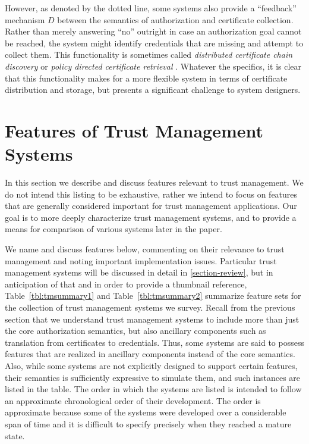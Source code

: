 However, as denoted by the dotted line, some systems also provide a
``feedback'' mechanism $D$ between the semantics of authorization and
certificate collection.  Rather than merely answering ``no'' outright
in case an authorization goal cannot be reached, the system might
identify credentials that are missing and attempt to collect them.
This functionality is sometimes called \emph{distributed certificate
chain discovery} \cite{Li:DCDTM} or \emph{policy directed certificate
retrieval} \cite{Gunter:PDCR}.
Whatever the specifics, it is clear that this functionality makes for
a more flexible system in terms of certificate distribution and
storage, but presents a significant challenge to system designers.

\section{Features of Trust Management Systems}
\label{section-features}

In this section we describe and discuss features relevant to trust
management.  We do not intend this listing to be exhaustive, rather we
intend to focus on features that are generally considered important
for trust management applications.  Our goal is to more deeply
characterize trust management systems, and to provide a means for
comparison of various systems later in the paper.

We name and discuss features below, commenting on their relevance to trust
management and noting important implementation issues. Particular trust
management systems will be discussed in detail in \autoref{section-review},
but in anticipation of that and in order to provide a thumbnail reference,
Table~\ref{tbl:tmsummary1} and Table~\ref{tbl:tmsummary2} summarize feature
sets for the collection of trust management systems we survey. Recall from
the previous section that we understand trust management systems to
include more than just the core authorization semantics, but also ancillary
components such as translation from certificates to credentials. Thus, some
systems are said to possess features that are realized in ancillary
components instead of the core semantics. Also, while some systems are
not explicitly designed to support certain features, their semantics is
sufficiently expressive to simulate them, and such instances are listed in
the table. The order in which the systems are listed is
intended to follow an approximate chronological order of their development.
The order is approximate because some of the systems were developed over
a considerable span of time and it is difficult to specify precisely
when they reached a mature state.

